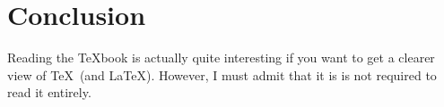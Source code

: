 \section{Conclusion}

Reading the \TeX book \cite{knuth1984} is actually quite interesting if you want to get a clearer view of \TeX\ (and \LaTeX). However, I must admit that it is is not required to read it entirely.
